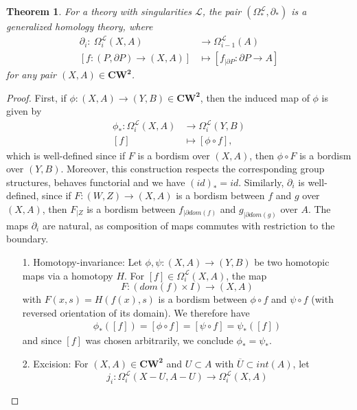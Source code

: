 \documentclass{scrreprt}
\newtheorem{theorem}[prop]{Theorem}
\begin{document}
\begin{theorem}
For a theory with singularities $\mathcal{L}$, the pair $(\Omega_*^{\mathcal{L}}, \partial_*)$ is a generalized homology theory, where 
\begin{align*}
\partial_i :\  \Omega_i^{\mathcal{L}}(X,A) &\to \Omega_{i-1}^{\mathcal{L}}(A) \\
[f: (P, \partial P) \to (X,A)] &\mapsto [f_{| \partial P}: \partial P \to A]
\end{align*}
for any pair $(X,A) \in \boldsymbol{CW^2}$.
\end{theorem}

\begin{proof}
First, if $\phi : (X,A) \to (Y,B) \in \boldsymbol{CW^2}$, then the induced map of $\phi $ is given by
\begin{align*}
\phi_* : \Omega_i^{\mathcal{L}}(X,A) &\to \Omega_i^{\mathcal{L}}(Y,B) \\
[f] &\mapsto [\phi \circ f],
\end{align*}
which is well-defined since if $F$ is a bordism over $(X,A)$, then $\phi \circ F$ is a bordism over $(Y,B)$. Moreover, this construction respects the corresponding group structures, behaves functorial and we have $(id)_*=id$. Similarly, $\partial_i$ is well-defined, since if $F:(W,Z) \to (X,A)$ is a bordism between $f$ and $g$ over $(X,A)$, then $F_{|Z}$ is a bordism between $f_{| \partial dom(f)}$ and $g_{| \partial dom(g)}$ over $A$. The maps $\partial_i$ are natural, as composition of maps commutes with restriction to the boundary. 
\begin{itemize}
\item[1.] Homotopy-invariance: Let $\phi, \psi : (X,A) \to (Y,B)$ be two homotopic maps via a homotopy $H$. For $[f] \in \Omega_i^{\mathcal{L}}(X,A)$, the map
\begin{equation*}
F: (dom(f) \times I) \to (X,A) 
\end{equation*}
with $F(x,s)=H(f(x),s)$ is a bordism between $\phi \circ f$ and $\psi \circ f$ (with reversed orientation of its domain). We therefore have
\begin{align*}
\phi_* ([f]) = [\phi \circ f] = [\psi \circ f] = \psi_* ([f])
\end{align*}
and since $[f]$ was chosen arbitrarily, we conclude $\phi_*= \psi_*$.
\item[2.] Excision: For $(X,A) \in \boldsymbol{CW^2}$ and $U \subset A$ with $\overline{U} \subset int(A)$, let 
\begin{equation*}
j_i: \Omega_i^{\mathcal{L}}(X-U, A-U) \to \Omega_i^{\mathcal{L}}(X,A)

\end{equation*}
\end{itemize}
\end{proof}
\end{document}

